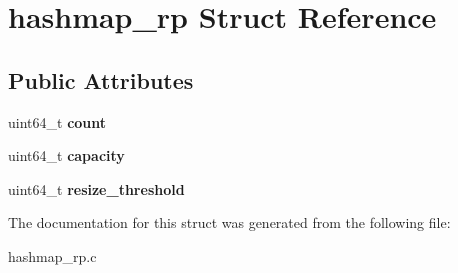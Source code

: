 \hypertarget{structhashmap__rp}{}\section{hashmap\+\_\+rp Struct Reference}
\label{structhashmap__rp}
\subsection*{Public Attributes}
\begin{DoxyCompactItemize}
\item 
uint64\+\_\+t {\bfseries count}\hypertarget{structhashmap__rp_ab6c1dfb752de6101545bb92dcccc419a}{}\label{structhashmap__rp_ab6c1dfb752de6101545bb92dcccc419a}

\item 
uint64\+\_\+t {\bfseries capacity}\hypertarget{structhashmap__rp_a964fc2490d30dc7a73328999f7759076}{}\label{structhashmap__rp_a964fc2490d30dc7a73328999f7759076}

\item 
uint64\+\_\+t {\bfseries resize\+\_\+threshold}\hypertarget{structhashmap__rp_afcf78d28515e6c63cddd440e5b02c79c}{}\label{structhashmap__rp_afcf78d28515e6c63cddd440e5b02c79c}

\end{DoxyCompactItemize}


The documentation for this struct was generated from the following file\+:\begin{DoxyCompactItemize}
\item 
hashmap\+\_\+rp.\+c\end{DoxyCompactItemize}
